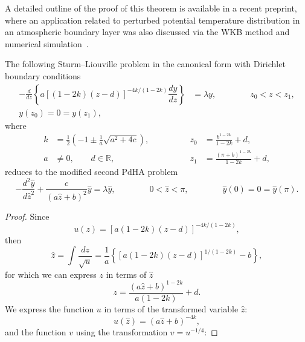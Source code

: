 \documentclass[symmetry,article,accept,moreauthors,pdftex,a4paper]{mdpi}
\begin{document}
\begin{paracol}{2}
A detailed outline of the proof of this theorem is available in a recent preprint, where an application related to perturbed potential temperature distribution in an atmospheric boundary layer was also discussed via the WKB method and numerical simulation~\cite{karjanto2021perturbed}.

\begin{Proposition}
The following Sturm--Liouville problem in the canonical form with Dirichlet boundary conditions
\begin{align*}
-\frac{d}{dz}\left\{a\left[(1 - 2k)(z - d) \right]^{-4k/(1 - 2k)} \dfrac{dy}{dz} \right\} &= \lambda y, \qquad \qquad z_0 < z < z_1, \\
y(z_0) = 0 = y(z_1),
\end{align*}
where
\begin{align*}
   k &= \frac{1}{2}\left(-1 \pm \frac{1}{a}\sqrt{a^2 + 4c} \right), \qquad \qquad 
&z_0 &= \frac{b^{1 -2k}}{1 - 2k} + d, \\
   a &\neq 0, \qquad d \in \mathbb{R}, \qquad \qquad %
&z_1 &= \frac{(\pi + b)^{1 -2k}}{1 - 2k} + d,
\end{align*}
reduces to the modified second PdHA problem
\begin{equation}
-\frac{d^2\widehat{y}}{d\widehat{z}^2} + \frac{c}{(a\widehat{z} + b)^2} \widehat{y} = \lambda \widehat{y}, \qquad \qquad 0 < \widehat{z} < \pi, \qquad \qquad \widehat{y}(0) = 0 = \widehat{y}(\pi).
\end{equation}
\end{Proposition}
\begin{proof}
Since
\begin{equation*}
u(z) = \left[a(1 - 2k)(z - d) \right]^{-4k/(1 - 2k)},
\end{equation*}
then
\begin{equation*}
\widehat{z} = \int \frac{dz}{\sqrt{u}} = \frac{1}{a} \left\{ \left[a(1 - 2k)(z - d) \right]^{1/(1 - 2k)} - b \right\},
\end{equation*}
for which we can express $z$ in terms of $\widehat{z}$
\begin{equation*}
z = \frac{\left(a\widehat{z} + b\right)^{1 - 2k}}{a(1 - 2k)} + d.
\end{equation*}
We express the function $u$ in terms of the transformed variable $\widehat{z}$:
\begin{equation*}
u(\widehat{z}) = \left(a\widehat{z} + b\right)^{-4k},
\end{equation*} 
and the function $v$ using the transformation $v = u^{-1/4}$:

\end{proof}
\end{paracol}
\end{document}
